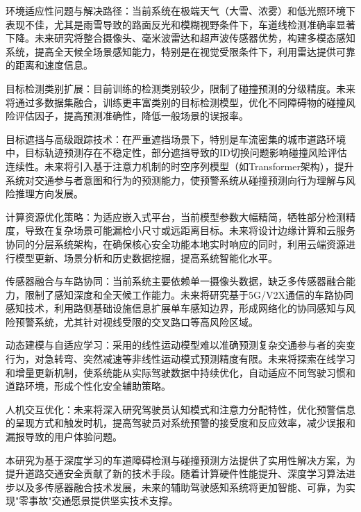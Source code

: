 \documentclass[a4paper, UTF8, fontsize=12pt]{ctexart} %
\numberwithin{equation}{section} %
\begin{document}
\begin{parlist}
    \item 环境适应性问题与解决路径：当前系统在极端天气（大雪、浓雾）和低光照环境下表现不佳，尤其是雨雪导致的路面反光和模糊视野条件下，车道线检测准确率显著下降。未来研究将整合摄像头、毫米波雷达和超声波传感器优势，构建多模态感知系统，提高全天候全场景感知能力，特别是在视觉受限条件下，利用雷达提供可靠的距离和速度信息。

    \item 目标检测类别扩展：目前训练的检测类别较少，限制了碰撞预测的分级精度。未来将通过多数据集融合，训练更丰富类别的目标检测模型，优化不同障碍物的碰撞风险评估因子，提高预测准确性，降低一般场景的误报率。

    \item 目标遮挡与高级跟踪技术：在严重遮挡场景下，特别是车流密集的城市道路环境中，目标轨迹预测存在不稳定性，部分遮挡导致的ID切换问题影响碰撞风险评估连续性。未来将引入基于注意力机制的时空序列模型（如Transformer架构），提升系统对交通参与者意图和行为的预测能力，使预警系统从碰撞预测向行为理解与风险推理方向发展。

    \item 计算资源优化策略：为适应嵌入式平台，当前模型参数大幅精简，牺牲部分检测精度，导致在复杂场景可能漏检小尺寸或远距离目标。未来将设计边缘计算和云服务协同的分层系统架构，在确保核心安全功能本地实时响应的同时，利用云端资源进行模型更新、场景分析和历史数据挖掘，提高系统智能化水平。

    \item 传感器融合与车路协同：当前系统主要依赖单一摄像头数据，缺乏多传感器融合能力，限制了感知深度和全天候工作能力。未来将研究基于5G/V2X通信的车路协同感知技术，利用路侧基础设施信息扩展单车感知边界，形成网络化的协同感知与风险预警系统，尤其针对视线受限的交叉路口等高风险区域。

    \item 动态建模与自适应学习：采用的线性运动模型难以准确预测复杂交通参与者的突变行为，对急转弯、突然减速等非线性运动模式预测精度有限。未来将探索在线学习和增量更新机制，使系统能从实际驾驶数据中持续优化，自动适应不同驾驶习惯和道路环境，形成个性化安全辅助策略。

    \item 人机交互优化：未来将深入研究驾驶员认知模式和注意力分配特性，优化预警信息的呈现方式和触发时机，提高驾驶员对系统预警的接受度和反应效率，减少误报和漏报导致的用户体验问题。
\end{parlist}

本研究为基于深度学习的车道障碍检测与碰撞预测方法提供了实用性解决方案，为提升道路交通安全贡献了新的技术手段。随着计算硬件性能提升、深度学习算法进步以及多传感器融合技术发展，未来的辅助驾驶感知系统将更加智能、可靠，为实现"零事故"交通愿景提供坚实技术支撑。
\end{document}

